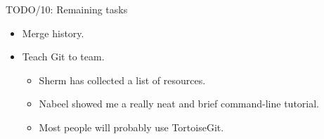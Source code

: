 \documentclass[pdf, 8pt]{beamer}
\def\NUMDECISIONS{10}
\begin{document}
\begin{frame}{TODO/\NUMDECISIONS: Remaining tasks}
\begin{itemize}
\item Merge history.
\item Teach Git to team.
    \begin{itemize}
        \item Sherm has collected a list of resources.
        \item Nabeel showed me a really neat and brief command-line tutorial.
        \item Most people will probably use TortoiseGit.
    \end{itemize}
\end{itemize}
\end{frame}
\end{document}
